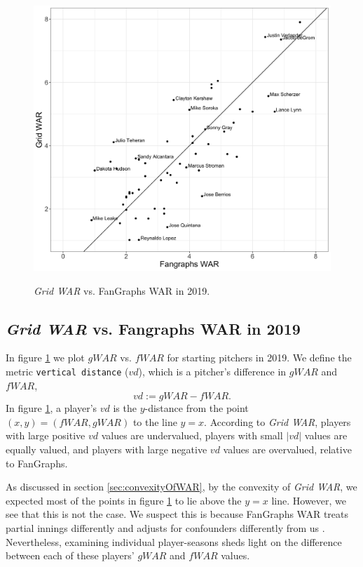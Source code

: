 \documentclass[12pt]{article}
\begin{document}
\begin{figure}[t!]
\centering
\caption{\textit{Grid WAR} vs. FanGraphs WAR in 2019.} 
\includegraphics[width=15cm]{../writeup_plots/plot_gwar_vs_fwar_2019.png}
\label{fig:gwarVfwar19}
\end{figure}

\subsection{\textit{Grid WAR} vs. Fangraphs WAR in 2019}

In figure \ref{fig:gwarVfwar19} we plot $gWAR$ vs. $fWAR$ for starting pitchers in 2019. We define the metric \texttt{vertical distance} ($vd$), which is a pitcher's difference in $gWAR$ and $fWAR$,
\begin{equation}
vd := gWAR - fWAR.
\label{eqn:vd}
\end{equation}
In figure \ref{fig:gwarVfwar19}, a player's $vd$ is the $y$-distance from the point $(x,y)=(fWAR,gWAR)$ to the line $y=x$. According to \textit{Grid WAR}, players with large positive $vd$ values are undervalued, players with small $|vd|$ values are equally valued, and players with large negative $vd$ values are overvalued, relative to FanGraphs.

As discussed in section \ref{sec:convexityOfWAR}, by the convexity of \textit{Grid WAR}, we expected most of the points in figure \ref{fig:gwarVfwar19} to lie above the $y=x$ line. However, we see that this is not the case. We suspect this is because FanGraphs WAR
treats partial innings differently and adjusts for confounders differently from us \citep{war_FG}. Nevertheless, examining individual player-seasons sheds light on the difference between each of these players' $gWAR$ and $fWAR$ values. 
\end{document}
